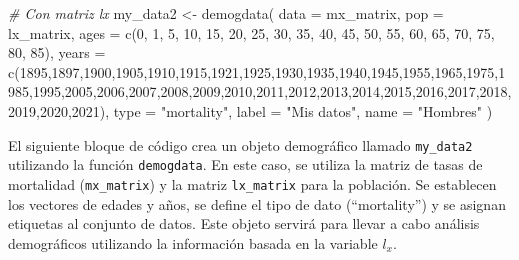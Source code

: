 \documentclass[
]{article}
\newenvironment{Shaded}{\begin{snugshade}}{\end{snugshade}}
\newcommand{\AttributeTok}[1]{\textcolor[rgb]{0.77,0.63,0.00}{#1}}
\newcommand{\CommentTok}[1]{\textcolor[rgb]{0.56,0.35,0.01}{\textit{#1}}}
\newcommand{\DecValTok}[1]{\textcolor[rgb]{0.00,0.00,0.81}{#1}}
\newcommand{\FunctionTok}[1]{\textcolor[rgb]{0.00,0.00,0.00}{#1}}
\newcommand{\NormalTok}[1]{#1}
\newcommand{\OtherTok}[1]{\textcolor[rgb]{0.56,0.35,0.01}{#1}}
\newcommand{\StringTok}[1]{\textcolor[rgb]{0.31,0.60,0.02}{#1}}
\begin{document}
\begin{Shaded}
\begin{Highlighting}[]
\CommentTok{\# Con matriz lx}
\NormalTok{my\_data2 }\OtherTok{\textless{}{-}} \FunctionTok{demogdata}\NormalTok{(}
  \AttributeTok{data =}\NormalTok{ mx\_matrix,           }
  \AttributeTok{pop =}\NormalTok{ lx\_matrix,}
  \AttributeTok{ages =} \FunctionTok{c}\NormalTok{(}\DecValTok{0}\NormalTok{, }\DecValTok{1}\NormalTok{, }\DecValTok{5}\NormalTok{, }\DecValTok{10}\NormalTok{, }\DecValTok{15}\NormalTok{, }\DecValTok{20}\NormalTok{, }\DecValTok{25}\NormalTok{, }\DecValTok{30}\NormalTok{, }\DecValTok{35}\NormalTok{, }\DecValTok{40}\NormalTok{, }\DecValTok{45}\NormalTok{, }\DecValTok{50}\NormalTok{, }\DecValTok{55}\NormalTok{, }\DecValTok{60}\NormalTok{, }\DecValTok{65}\NormalTok{, }\DecValTok{70}\NormalTok{, }\DecValTok{75}\NormalTok{, }\DecValTok{80}\NormalTok{, }\DecValTok{85}\NormalTok{),       }
  \AttributeTok{years =} \FunctionTok{c}\NormalTok{(}\DecValTok{1895}\NormalTok{,}\DecValTok{1897}\NormalTok{,}\DecValTok{1900}\NormalTok{,}\DecValTok{1905}\NormalTok{,}\DecValTok{1910}\NormalTok{,}\DecValTok{1915}\NormalTok{,}\DecValTok{1921}\NormalTok{,}\DecValTok{1925}\NormalTok{,}\DecValTok{1930}\NormalTok{,}\DecValTok{1935}\NormalTok{,}\DecValTok{1940}\NormalTok{,}\DecValTok{1945}\NormalTok{,}\DecValTok{1955}\NormalTok{,}\DecValTok{1965}\NormalTok{,}\DecValTok{1975}\NormalTok{,}\DecValTok{1985}\NormalTok{,}\DecValTok{1995}\NormalTok{,}\DecValTok{2005}\NormalTok{,}\DecValTok{2006}\NormalTok{,}\DecValTok{2007}\NormalTok{,}\DecValTok{2008}\NormalTok{,}\DecValTok{2009}\NormalTok{,}\DecValTok{2010}\NormalTok{,}\DecValTok{2011}\NormalTok{,}\DecValTok{2012}\NormalTok{,}\DecValTok{2013}\NormalTok{,}\DecValTok{2014}\NormalTok{,}\DecValTok{2015}\NormalTok{,}\DecValTok{2016}\NormalTok{,}\DecValTok{2017}\NormalTok{,}\DecValTok{2018}\NormalTok{,}\DecValTok{2019}\NormalTok{,}\DecValTok{2020}\NormalTok{,}\DecValTok{2021}\NormalTok{),   }
  \AttributeTok{type =} \StringTok{"mortality"}\NormalTok{,  }
  \AttributeTok{label =} \StringTok{"Mis datos"}\NormalTok{,}
  \AttributeTok{name =} \StringTok{"Hombres"}
\NormalTok{)}
\end{Highlighting}
\end{Shaded}

El siguiente bloque de código crea un objeto demográfico llamado
\texttt{my\_data2} utilizando la función \texttt{demogdata}. En este
caso, se utiliza la matriz de tasas de mortalidad (\texttt{mx\_matrix})
y la matriz \texttt{lx\_matrix} para la población. Se establecen los
vectores de edades y años, se define el tipo de dato (``mortality'') y
se asignan etiquetas al conjunto de datos. Este objeto servirá para
llevar a cabo análisis demográficos utilizando la información basada en
la variable \(l_x\).
\end{document}
